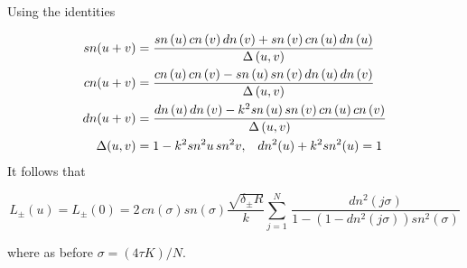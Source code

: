 Using the identities

\begin{align*}
    sn(u+v)&={\frac {sn \left( u \right) cn \left( v \right) dn
 \left( v \right) +sn \left( v \right) cn \left( u
 \right) dn \left( u \right) }{\Delta \left( u,v \right) }}
\\
cn(u+v)&={\frac {cn \left( u \right) cn \left( v \right) -sn
 \left( u \right) sn \left( v \right) dn \left( u \right) 
dn \left( v \right) }{\Delta \left( u,v \right) }}
\\
dn(u+v)&={\frac {dn \left( u \right) dn \left( v \right) -{k}^{2}{
\it sn} \left( u \right) sn \left( v \right) cn \left( u
 \right) cn \left( v \right) }{\Delta \left( u,v \right) }}\\
\Delta(u,v)&=1-k^2 sn^2u\, sn^2v,\;\;\;  dn^2(u)+k^2sn^2(u)=1
\end{align*}
It follows that 

\[L_\pm(u)=L_\pm(0)=2 \,cn(\sigma)
sn(\sigma) \frac{\sqrt{ \delta_{\pm}R}}{k} \sum_{j=1}^{N}
  \,\frac{
  dn^2(j \sigma) }{  1-   \left(1-  dn^{2}(j \sigma) \right) 
  sn^{2}(\sigma)}
\]

\noindent where as before $\sigma=(4 \tau K)/N$.







